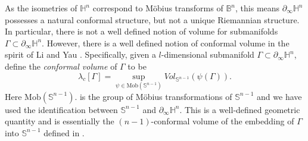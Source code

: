 \documentclass{amsart}
\theoremstyle{definition}
\theoremstyle{remark}
\numberwithin{equation}{section}
\begin{document}
As the isometries of $\mathbb{H}^n$ correspond to M\"{o}bius transforms of $\mathbb{B}^n$, this means $\partial_\infty \mathbb{H}^{n}$ possesses a natural conformal structure, but not a unique Riemannian structure.  In particular,  there is not a well defined notion of volume for submanifolds $\Gamma\subset \partial_\infty \mathbb{H}^n$.  However, there is a well defined notion of {conformal volume} in the spirit of Li and Yau \cite{Li1982}. 
Specifically, given a $l$-dimensional submanifold $\Gamma\subset \partial_\infty \mathbb{H}^{n}$, define the \emph{conformal volume} of $\Gamma$ to be
$$
\lambda_{c}[\Gamma]=\sup_{\psi\in \mathrm{Mob}(\mathbb{S}^{n-1})} Vol_{\mathbb{S}^{n-1}}(\psi(\Gamma)).
$$
Here $\mathrm{Mob}( \mathbb{S}^{n-1})$. is the group of M\"obius transformations of $\mathbb{S}^{n-1}$ and we have used the identification between $\mathbb{S}^{n-1}$ and $\partial_\infty \mathbb{H}^n$.  This is a well-defined geometric quantity and is essentially the $(n-1)$-conformal volume of the embedding of $\Gamma$ into $\mathbb{S}^{n-1}$ defined in \cite{Li1982}.
\end{document}
